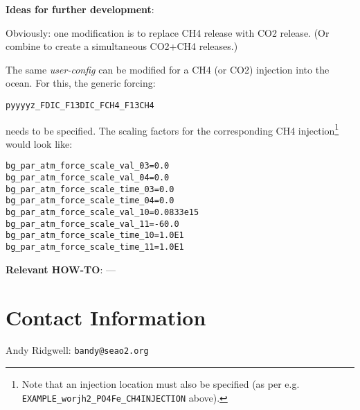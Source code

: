 \documentclass[10pt,twoside]{article}
\begin{document}
\noindent \textbf{Ideas for further development}:
\begin{compactenum}
\item Obviously: one modification is to replace CH4 release with CO2 release. (Or combine to create a simultaneous CO2+CH4 releases.)
\item The same \textit{user-config} can be modified for a CH4 (or CO2) injection into the ocean. For this, the generic forcing:
\vspace{-5pt}\begin{verbatim}pyyyyz_FDIC_F13DIC_FCH4_F13CH4\end{verbatim}\vspace{-5pt}
needs to be specified. The scaling factors for the corresponding CH4 injection\footnote{Note that an injection location must also be specified (as per e.g. \texttt{EXAMPLE\_worjh2\_PO4Fe\_CH4INJECTION} above).} would look like:
\begin{verbatim}
bg_par_atm_force_scale_val_03=0.0
bg_par_atm_force_scale_val_04=0.0
bg_par_atm_force_scale_time_03=0.0
bg_par_atm_force_scale_time_04=0.0
bg_par_atm_force_scale_val_10=0.0833e15
bg_par_atm_force_scale_val_11=-60.0
bg_par_atm_force_scale_time_10=1.0E1
bg_par_atm_force_scale_time_11=1.0E1
		\end{verbatim}
\end{compactenum}

\noindent \textbf{Relevant HOW-TO}: ---



\newpage
\section{Contact Information}

\begin{compactitem}
	\item Andy Ridgwell: \texttt{bandy@seao2.org}
\end{compactitem}



\end{document}
